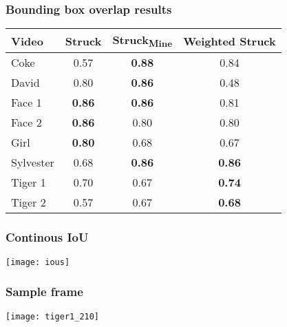 \begin{frame}
    \frametitle{Bounding box overlap results}
    \begin{center}
        \begin{tabular}{l c c c }
            \toprule
            Video & Struck\textsubscript{\cite{6126251}} & Struck\textsubscript{Mine} & Weighted Struck \\
            \midrule
            Coke      &         0.57  & \textbf{0.88} &         0.84  \\
            David     &         0.80  & \textbf{0.86} &         0.48  \\
            Face 1    & \textbf{0.86} & \textbf{0.86} &         0.81  \\
            Face 2    & \textbf{0.86} &         0.80  &         0.80  \\
            Girl      & \textbf{0.80} &         0.68  &         0.67  \\
            Sylvester &         0.68  & \textbf{0.86} & \textbf{0.86} \\
            Tiger 1   &         0.70  &         0.67  & \textbf{0.74} \\
            Tiger 2   &         0.57  &         0.67  & \textbf{0.68} \\
            \bottomrule
        \end{tabular}
    \end{center}
\end{frame}

\begin{frame}
    \frametitle{Continous IoU}
    \begin{center}
        \texttt{[image: ious]}
    \end{center}
\end{frame}

\begin{frame}
    \frametitle{Sample frame}
    \begin{center}
        \texttt{[image: tiger1\_210]}
    \end{center}
\end{frame}

